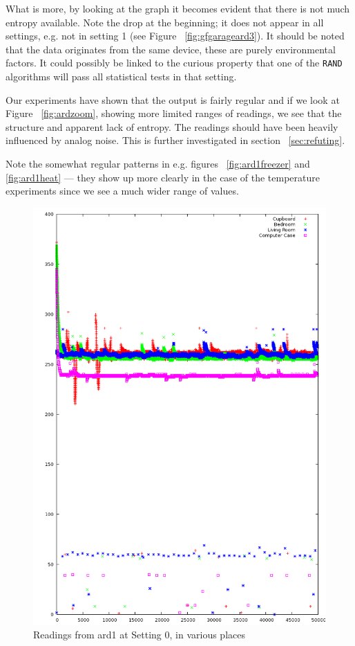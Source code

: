 \documentclass[a4paper]{article}           %
\begin{document}
What is more, by looking at the graph it becomes evident that there is not much entropy available. Note the drop at the beginning; it does not appear in all settings, e.g. not in setting 1 (see Figure ~\ref{fig:gfgarageard3}). It should be noted that the data originates from the same device, these are purely environmental factors. It could possibly be linked to the curious property that one of the \texttt{RAND} algorithms will pass all statistical tests in that setting. 

Our experiments have shown that the output is fairly regular and if we look at Figure ~\ref{fig:ardzoom}, showing more limited ranges of readings, we see that the structure and apparent lack of entropy. The readings should have been heavily influenced by analog noise\cite{ardref}. This is further investigated in section ~\ref{sec:refuting}. 

Note the somewhat regular patterns in e.g. figures ~\ref{fig:ard1freezer} and \ref{fig:ard1heat} --- they show up more clearly in the case of the temperature experiments since we see a much wider range of values. 

\begin{figure}[h!]
  \centering  
  \includegraphics[width=0.7\columnwidth]{img/RoomTempOverlay.png}
  
  \caption{Readings from ard1 at Setting 0, in various places}
  \label{fig:ard3space}
\end{figure}
\end{document}
